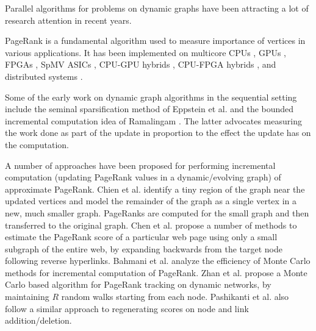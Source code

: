 Parallel algorithms for problems on dynamic graphs have been attracting a lot of research attention in recent years. PageRank is a fundamental algorithm used to measure importance of vertices in various applications. It has been implemented on multicore CPUs \cite{rank-garg16}, GPUs \cite{rank-nvgraph}, FPGAs \cite{rank-guoqiang20}, SpMV ASICs \cite{rank-sadi18}, CPU-GPU hybrids \cite{rank-giri20}, CPU-FPGA hybrids \cite{rank-li21}, and distributed systems \cite{rank-sarma13}.

Some of the early work on dynamic graph algorithms in the sequential setting include the seminal sparsification method of Eppstein et al. \cite{graph-eppstein97} and the bounded incremental computation idea of Ramalingam \cite{incr-ramalingam96}. The latter advocates measuring the work done as part of the update in proportion to the effect the update has on the computation.


A number of approaches have been proposed for performing incremental computation (updating PageRank values in a dynamic/evolving graph) of approximate PageRank. Chien et al. \cite{rank-chien01} identify a tiny region of the graph near the updated vertices and model the remainder of the graph as a single vertex in a new, much smaller graph. PageRanks are computed for the small graph and then transferred to the original graph. Chen et al. \cite{chen2004local} propose a number of methods to estimate the PageRank score of a particular web page using only a small subgraph of the entire web, by expanding backwards from the target node following reverse hyperlinks. Bahmani et al. \cite{bahmani2010fast} analyze the efficiency of Monte Carlo methods for incremental computation of PageRank. Zhan et al. \cite{zhan2019fast} propose a Monte Carlo based algorithm for PageRank tracking on dynamic networks, by maintaining $R$ random walks starting from each node. Pashikanti et al. also follow a similar approach to regenerating scores on node and link addition/deletion.

